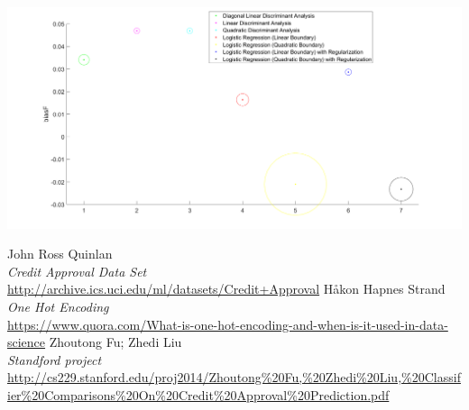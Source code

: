 \documentclass[a4paper,8pt]{article}
\newenvironment{Figure}
  {\par\medskip\noindent\minipage{\linewidth}}
  {\endminipage\par\medskip}
\begin{document}
\begin{Figure}
 \centering
 \includegraphics[width=\linewidth]{BVP}
\end{Figure}

\begin{thebibliography}{10}
	John Ross Quinlan \\
	\emph{Credit Approval Data Set} \\
	\url{http://archive.ics.uci.edu/ml/datasets/Credit+Approval}
	Håkon Hapnes Strand \\
	\emph{One Hot Encoding} \\
	\url{https://www.quora.com/What-is-one-hot-encoding-and-when-is-it-used-in-data-science}
	Zhoutong Fu; Zhedi Liu \\
	\emph{Standford project} \\
	\url{http://cs229.stanford.edu/proj2014/Zhoutong\%20Fu,\%20Zhedi\%20Liu,\%20Classifier\%20Comparisons\%20On\%20Credit\%20Approval\%20Prediction.pdf}
	
\end{thebibliography}
\end{document}
